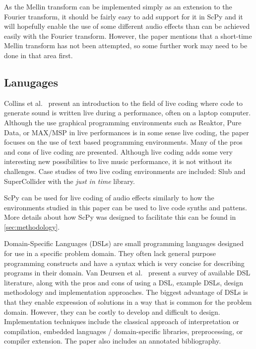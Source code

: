 \documentclass{article}
\begin{document}
As the Mellin transform can be implemented simply as an extension to the Fourier transform, it
should be fairly easy to add support for it in ScPy and it will hopefully enable the use of
some different audio effects than can be achieved easily with the Fourier transform. However, the
paper mentions that a short-time Mellin transform has not been attempted, so some further work may
need to be done in that area first.

\subsection{Lanugages}

Collins et al.~\cite{collins2003live} present an introduction to the field of live coding where
code to generate sound is written live during a performance, often on a laptop computer. Although
the use graphical programming environments such as Reaktor, Pure Data, or MAX/MSP in live
performances is in some sense live coding, the paper focuses on the use of text based programming
environments. Many of the pros and cons of live coding are presented. Although live coding adds
some very interesting new possibilities to live music performance, it is not without its
challenges. Case studies of two live coding environments are included: Slub and SuperCollider with
the \textit{just in time} library.

ScPy can be used for live coding of audio effects similarly to how the environments studied in
this paper can be used to live code synths and pattens. More details about how ScPy was designed to
facilitate this can be found in \autoref{sec:methodology}.

Domain-Specific Languages (DSLs) are small programming languages designed for use in a specific
problem domain. They often lack general purpose programming constructs and have a syntax which is
very concise for describing programs in their domain. Van Deursen et al.~\cite{van2000domain}
present a survey of available DSL literature, along with the pros and cons of using a DSL, example
DSLs, design methodology and implementation approaches. The biggest advantage of DSLs is that they
enable expression of solutions in a way that is common for the problem domain. However, they can be
costly to develop and difficult to design. Implementation techniques include the classical approach
of interpretation or compilation, embedded languages / domain-specific libraries, preprocessing, or
compiler extension. The paper also includes an annotated bibliography.
\end{document}
